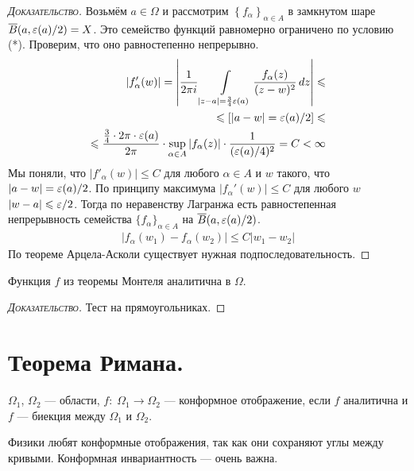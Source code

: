 \documentclass[../complex-analysis.tex]{subfiles}
\begin{document}
\begin{proof}[\normalfont\textsc{Доказательство}]
 Возьмём $ a \in \Omega $ и рассмотрим $ \left\{f_{\alpha} \right\}_{\alpha \in A} $ в замкнутом шаре $ \overline{B}(a, \varepsilon(a) / 2) = X $. Это семейство функций равномерно ограничено по условию (*). Проверим, что оно равностепенно непрерывно.
 \begin{align*}
  \left|f_\alpha'(w) \right| = \left|\frac{1}{2\pi i} \int\limits_{\left| z - a \right| = \frac{3}{4} \varepsilon(a)}   \frac{f_\alpha(z)}{(z-w)^{2}}\,dz \right| \leqslant \\
  \leqslant [\left| a-w \right| = \varepsilon(a) / 2] \leqslant \\
  \leqslant \frac{\frac{3}{4} \cdot 2\pi \cdot \varepsilon(a)}{2\pi} \cdot \sup_{\alpha \in A} \left|f_\alpha(z) \right| \cdot \frac{1}{(\varepsilon(a) / 4)^{2}} = C < \infty
 \end{align*} Мы поняли, что $ \left| f'_\alpha(w) \right| \leqslant C $ для любого $ \alpha \in A $ и $ w $ такого, что  $ \left| a-w \right| = \varepsilon(a) / 2 $. По принципу максимума $ \left| f_\alpha'(w) \right| \leqslant C $ для любого $ w  $ $ \left| w-a \right| \leqslant \varepsilon / 2 $. Тогда по неравенству Лагранжа есть равностепенная непрерывность семейства $ \{f_{\alpha}\}_{\alpha \in A}   $ на $ \overline B(a, \varepsilon(a) / 2) $.
 \begin{align*}
  \left| f_{\alpha}(w_1) - f_{\alpha}(w_2) \right| \leqslant C \left| w_1 - w_2 \right|
 \end{align*} По теореме Арцела-Асколи существует нужная подпоследовательность.
\end{proof}

\begin{remrk}
 Функция $ f $ из теоремы Монтеля аналитична в $ \Omega $.
\end{remrk}
\begin{proof}[\normalfont\textsc{Доказательство}]
 Тест на прямоугольниках.
\end{proof}

\newpage
\section{Теорема Римана.}

\begin{df}
 $ \Omega_1 $, $ \Omega_2 $ --- области, $ f \colon\; \Omega_1 \to \Omega_2 $ --- конформное отображение, если $ f $ аналитична и $ f $ --- биекция между $ \Omega_1 $ и $ \Omega_2 $.
\end{df}

Физики любят конформные отображения, так как они сохраняют углы между кривыми. Конформная инвариантность --- очень важна.
\end{document}
